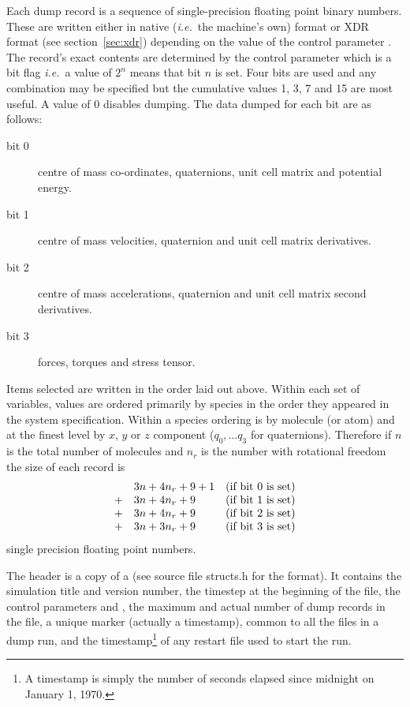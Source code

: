 \documentclass[a4paper,twoside]{report}
\newcommand{\Fname}[1]{{\upshape\mdseries\sffamily#1}}
\newcommand{\ie}{\emph{i.e.}}
\begin{document}
Each dump record is a sequence of single-precision floating point
binary numbers.  These are written either in native (\ie\ the
machine's own) format or XDR format (see section~\ref{sec:xdr})
depending on the value of the control parameter .  The
record's exact contents are determined by the control parameter
 which is a bit flag \ie\ a value of $2^{n}$
means that bit $n$ is set.  Four bits are used and any combination may
be specified but the cumulative values 1, 3, 7 and 15 are most
useful.  A value of 0 disables dumping. The data dumped for each bit
are as follows:
\begin{description}
\item[bit 0]    centre of mass co-ordinates, quaternions, unit cell matrix 
and potential energy.         
\item[bit 1]    centre of mass velocities, quaternion and unit cell
matrix derivatives.
\item[bit 2]    centre of mass accelerations, quaternion and unit cell
matrix second derivatives.
\item[bit 3]    forces, torques and stress tensor.
\end{description}
Items selected are written in the order laid out above.  Within each
set of variables, values are ordered primarily by species in the order
they appeared in the system specification.  Within a species ordering
is by molecule (or atom) and at the finest level by $x$, $y$ or $z$
component ($q_{0}, \ldots q_{3}$ for quaternions). Therefore if $n$ is
the total number of molecules and $n_{r}$ is the number with
rotational freedom the size of each record is
\begin{displaymath}
\begin{array}{cll}
   & 3n + 4n_{r} + 9 + 1 & \textnormal{(if bit 0 is set)} \\
 + & 3n + 4n_{r} + 9 & \textnormal{(if bit 1 is set)} \\
 + & 3n + 4n_{r} + 9 & \textnormal{(if bit 2 is set)} \\
 + & 3n + 3n_{r} + 9 & \textnormal{(if bit 3 is set)} \\
\end{array}
\end{displaymath}
single precision floating point numbers.

The header is a copy of a  (see
source file \Fname{structs.h} for the format). It contains the simulation
title and version number, the timestep at the beginning of the file,
the control parameters  and , the
maximum and actual number of dump records in the file, a unique marker
(actually a timestamp), common to all the files in a dump run, and the
timestamp\footnote{A timestamp is simply the number of seconds elapsed
  since midnight on January 1, 1970.} of any restart file used to
start the run.
\end{document}
